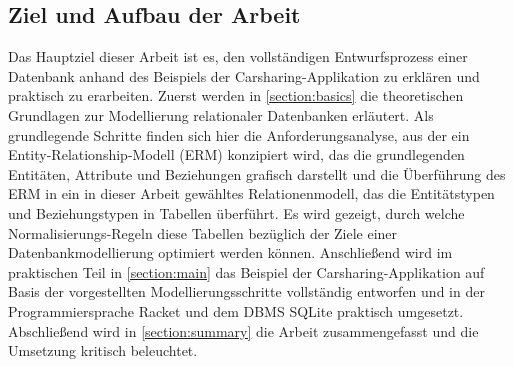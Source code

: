 \subsection{Ziel und Aufbau der Arbeit}
Das Hauptziel dieser Arbeit ist es, den vollständigen Entwurfsprozess einer Datenbank anhand des Beispiels der Carsharing-Applikation zu erklären und praktisch zu erarbeiten. Zuerst werden in \autoref{section:basics} die theoretischen Grundlagen zur Modellierung relationaler Datenbanken erläutert. Als grundlegende Schritte finden sich hier die Anforderungsanalyse, aus der ein Entity-Relationship-Modell (ERM) konzipiert wird, das die grundlegenden Entitäten, Attribute und Beziehungen grafisch darstellt und die Überführung des ERM in ein in dieser Arbeit gewähltes Relationenmodell, das die Entitätstypen und Beziehungstypen in Tabellen überführt. Es wird gezeigt, durch welche Normalisierungs-Regeln diese Tabellen bezüglich der Ziele einer Datenbankmodellierung optimiert werden können. Anschließend wird im praktischen Teil in \autoref{section:main} das Beispiel der Carsharing-Applikation auf Basis der vorgestellten Modellierungsschritte vollständig entworfen und in der Programmiersprache Racket und dem DBMS SQLite praktisch umgesetzt. Abschließend wird in \autoref{section:summary} die Arbeit zusammengefasst und die Umsetzung kritisch beleuchtet.
